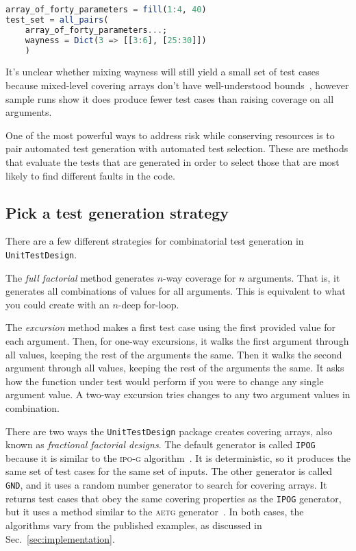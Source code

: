 \documentclass{juliacon}
\newcommand{\utd}{\texttt{UnitTestDesign}\xspace}
\begin{document}
\begin{lstlisting}[language=Julia]
array_of_forty_parameters = fill(1:4, 40)
test_set = all_pairs(
    array_of_forty_parameters...;
    wayness = Dict(3 => [[3:6], [25:30]])
    )
\end{lstlisting}
It's unclear whether mixing wayness will still yield a small set of test cases because mixed-level covering arrays don't have well-understood bounds~\cite{Cohen2003-pg}, however sample runs show it does produce fewer test cases than raising coverage on all arguments.

\vskip 6pt
One of the most powerful ways to address risk while conserving resources is to pair automated test generation with automated test selection. These are methods that evaluate the tests that are generated in order to select those that are most likely to find different faults in the code.

\subsection{Pick a test generation strategy}

There are a few different strategies for combinatorial test generation in \utd.

\vskip 6pt
The \emph{full factorial} method generates $n$-way coverage for $n$ arguments. That is, it generates all combinations of values for all arguments. This is equivalent to what you could create with an $n$-deep for-loop.

\vskip 6pt
The \emph{excursion} method makes a first test case using the first provided value for each argument. Then, for one-way excursions, it walks the first argument through all values, keeping the rest of the arguments the same. Then it walks the second argument through all values, keeping the rest of the arguments the same. It asks how the function under test would perform if you were to change any single argument value. A two-way excursion tries changes to any two argument values in combination.

\vskip 6pt
There are two ways the \utd package creates covering arrays, also known as \emph{fractional factorial designs}. The default generator is called \verb|IPOG| because it is similar to the \textsc{ipo-g} algorithm~\cite{Lei2008-xt}. It is deterministic, so it produces the same set of test cases for the same set of inputs. The other generator is called \verb|GND|, and it uses a random number generator to search for covering arrays. It returns test cases that obey the same covering properties as the \verb|IPOG| generator, but it uses a method similar to the \textsc{aetg} generator~\cite{Cohen1997-lb}. In both cases, the algorithms vary from the published examples, as discussed in Sec.~\ref{sec:implementation}.
\end{document}
